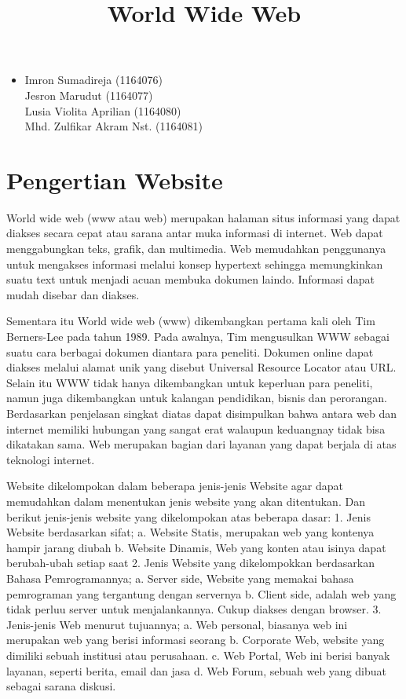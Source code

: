 \documentclass[12pt, a4paper]{article}
\begin{document}
\title{World Wide Web}
\maketitle

\begin{itemize}
\item
	Imron Sumadireja (1164076) \\
	Jesron Marudut (1164077) \\
	Lusia Violita Aprilian (1164080) \\
	Mhd. Zulfikar Akram Nst. (1164081) \\
\end{itemize}

\section{Pengertian Website}
World wide web (www atau web) merupakan halaman situs informasi yang dapat diakses secara cepat atau sarana antar muka informasi di internet. Web dapat menggabungkan teks, grafik, dan multimedia. Web memudahkan penggunanya untuk mengakses informasi melalui konsep hypertext sehingga memungkinkan  suatu text untuk menjadi acuan membuka dokumen laindo. Informasi dapat mudah disebar dan diakses.

Sementara itu World wide web (www) dikembangkan pertama kali oleh Tim Berners-Lee pada tahun 1989. Pada awalnya, Tim mengusulkan WWW sebagai suatu cara berbagai dokumen diantara para peneliti. Dokumen online dapat diakses melalui alamat unik yang disebut Universal Resource Locator atau URL. Selain itu WWW tidak hanya dikembangkan untuk keperluan para peneliti, namun juga dikembangkan untuk kalangan pendidikan, bisnis dan perorangan. Berdasarkan penjelasan singkat diatas dapat disimpulkan bahwa antara web dan internet memiliki hubungan yang sangat erat walaupun keduangnay tidak bisa dikatakan sama. Web merupakan bagian dari layanan yang dapat berjala di atas teknologi internet.

Website dikelompokan dalam beberapa jenis-jenis Website agar dapat memudahkan dalam menentukan jenis website yang akan ditentukan. Dan berikut jenis-jenis website yang dikelompokan atas beberapa dasar:
1. Jenis Website berdasarkan sifat;
	a. Website Statis, merupakan web yang kontenya hampir jarang diubah
	b. Website Dinamis, Web yang konten atau isinya dapat berubah-ubah setiap saat
2. Jenis Website yang dikelompokkan berdasarkan Bahasa Pemrogramannya;
	a. Server side, Website yang memakai bahasa pemrograman yang tergantung
		dengan servernya
	b. Client side, adalah web yang tidak perluu server untuk menjalankannya.
	   Cukup diakses dengan browser.
3. Jenis-jenis Web menurut tujuannya;
	a. Web personal, biasanya web ini merupakan web yang berisi informasi
	   seorang
	b. Corporate Web, website yang dimiliki sebuah institusi atau
	   perusahaan.
	c. Web Portal, Web ini berisi banyak layanan, seperti berita, email dan jasa
	d. Web Forum, sebuah web yang dibuat sebagai sarana diskusi.
	
\end{document}
